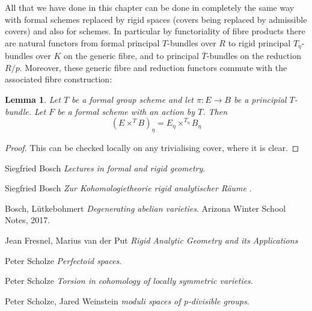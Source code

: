 \documentclass[11pt,oneside]{amsart}
\newtheorem{lemma}[theorem]{Lemma}
\theoremstyle{definition}
\theoremstyle{remark}
\begin{document}
	All that we have done in this chapter can be done in completely the same way with formal schemes replaced by rigid spaces (covers being replaced by admissible covers) and also for schemes. In particular by functoriality of fibre products there are natural functors from formal principal $T$-bundles over $R$ to rigid principal $T_\eta$-bundles over $K$ on the generic fibre, and to principal $\overline{T}$-bundles on the reduction $R/p$. Moreover, these generic fibre and reduction functors commute with the associated fibre construction:
	\begin{lemma}
		Let $T$ be a formal group scheme and let $\pi:E\rightarrow B$ be a principial $T$-bundle. Let $F$ be a formal scheme with an action by $T$. Then
		\[(E\times^T B)_\eta = E_\eta\times^{T_\eta} B_\eta \]
	\end{lemma}
	\begin{proof}
		This can be checked locally on any trivialising cover, where it is clear.
	\end{proof}
	
	\begin{thebibliography}{9}
		
		Siegfried Bosch
		\textit{Lectures in formal and rigid geometry}.
		
		Siegfried Bosch
		\textit{Zur Kohomologietheorie rigid analytischer R\"aume }.
		
		Bosch, L\"utkebohmert
		\textit{Degenerating abelian varieties}. 
		Arizona Winter School Notes, 2017.
		
		Jean Fresnel, Marius van der Put
		\textit{Rigid Analytic Geometry and its Applications}
		
		Peter Scholze
		\textit{Perfectoid spaces}. 
		
		Peter Scholze
		\textit{Torsion in cohomology of locally symmetric varieties}.
		
		Peter Scholze, Jared Weinstein
		\textit{moduli spaces of p-divisible groups}.
		
		
		
	\end{thebibliography}
	
	
	
	
	
	
	
	
	
	
	
	
	
	
\end{document}
